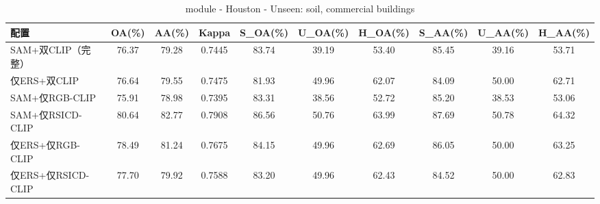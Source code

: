 \begin{table}[htbp]
\centering
\caption{module - Houston - Unseen: soil, commercial buildings}
\begin{tabular}{lccccccccc}
\hline
配置 & OA(\%) & AA(\%) & Kappa & S\_OA(\%) & U\_OA(\%) & H\_OA(\%) & S\_AA(\%) & U\_AA(\%) & H\_AA(\%) \\
\hline
SAM+双CLIP（完整） & 76.37 & 79.28 & 0.7445 & 83.74 & 39.19 & 53.40 & 85.45 & 39.16 & 53.71 \\
仅ERS+双CLIP & 76.64 & 79.55 & 0.7475 & 81.93 & 49.96 & 62.07 & 84.09 & 50.00 & 62.71 \\
SAM+仅RGB-CLIP & 75.91 & 78.98 & 0.7395 & 83.31 & 38.56 & 52.72 & 85.20 & 38.53 & 53.06 \\
SAM+仅RSICD-CLIP & 80.64 & 82.77 & 0.7908 & 86.56 & 50.76 & 63.99 & 87.69 & 50.78 & 64.32 \\
仅ERS+仅RGB-CLIP & 78.49 & 81.24 & 0.7675 & 84.15 & 49.96 & 62.69 & 86.05 & 50.00 & 63.25 \\
仅ERS+仅RSICD-CLIP & 77.70 & 79.92 & 0.7588 & 83.20 & 49.96 & 62.43 & 84.52 & 50.00 & 62.83 \\
\hline
\end{tabular}
\end{table}